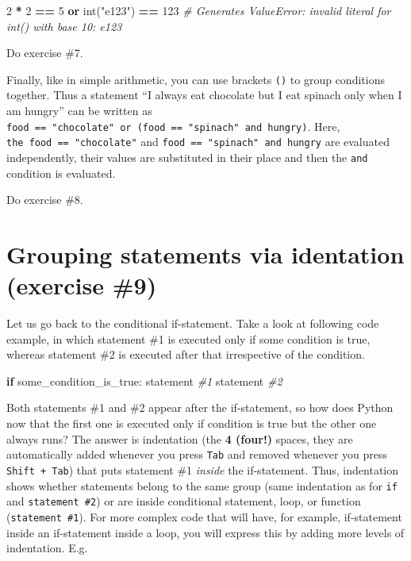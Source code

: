 \documentclass[
]{book}
\newenvironment{Shaded}{\begin{snugshade}}{\end{snugshade}}
\newcommand{\BuiltInTok}[1]{#1}
\newcommand{\CommentTok}[1]{\textcolor[rgb]{0.56,0.35,0.01}{\textit{#1}}}
\newcommand{\ControlFlowTok}[1]{\textcolor[rgb]{0.13,0.29,0.53}{\textbf{#1}}}
\newcommand{\DecValTok}[1]{\textcolor[rgb]{0.00,0.00,0.81}{#1}}
\newcommand{\KeywordTok}[1]{\textcolor[rgb]{0.13,0.29,0.53}{\textbf{#1}}}
\newcommand{\NormalTok}[1]{#1}
\newcommand{\OperatorTok}[1]{\textcolor[rgb]{0.81,0.36,0.00}{\textbf{#1}}}
\newcommand{\StringTok}[1]{\textcolor[rgb]{0.31,0.60,0.02}{#1}}
\begin{document}
\begin{Shaded}
\begin{Highlighting}[]
\DecValTok{2} \OperatorTok{*} \DecValTok{2} \OperatorTok{==} \DecValTok{5} \KeywordTok{or} \BuiltInTok{int}\NormalTok{(}\StringTok{"e123"}\NormalTok{) }\OperatorTok{==} \DecValTok{123}
\CommentTok{\# Generates ValueError: invalid literal for int() with base 10: \textquotesingle{}e123\textquotesingle{}}
\end{Highlighting}
\end{Shaded}

Do exercise \#7.

Finally, like in simple arithmetic, you can use brackets \texttt{()} to group conditions together. Thus a statement ``I always eat chocolate but I eat spinach only when I am hungry'' can be written as \texttt{food\ ==\ "chocolate"\ or\ (food\ ==\ "spinach"\ and\ hungry)}. Here, \texttt{the\ food\ ==\ "chocolate"} and \texttt{food\ ==\ "spinach"\ and\ hungry} are evaluated independently, their values are substituted in their place and then the \texttt{and} condition is evaluated.

Do exercise \#8.

\hypertarget{grouping-statements-via-identation-exercise-9}{%
\section{Grouping statements via identation (exercise \#9)}\label{grouping-statements-via-identation-exercise-9}}

Let us go back to the conditional if-statement. Take a look at following code example, in which statement \#1 is executed only if some condition is true, whereas statement \#2 is executed after that irrespective of the condition.

\begin{Shaded}
\begin{Highlighting}[]
\ControlFlowTok{if}\NormalTok{ some\_condition\_is\_true:}
\NormalTok{    statement }\CommentTok{\#1}
\NormalTok{statement }\CommentTok{\#2 }
\end{Highlighting}
\end{Shaded}

Both statements \#1 and \#2 appear after the if-statement, so how does Python now that the first one is executed only if condition is true but the other one always runs? The answer is indentation (the \textbf{4 (four!)} spaces, they are automatically added whenever you press \texttt{Tab} and removed whenever you press \texttt{Shift\ +\ Tab}) that puts statement \#1 \emph{inside} the if-statement. Thus, indentation shows whether statements belong to the same group (same indentation as for \texttt{if} and \texttt{statement\ \#2}) or are inside conditional statement, loop, or function (\texttt{statement\ \#1}). For more complex code that will have, for example, if-statement inside an if-statement inside a loop, you will express this by adding more levels of indentation. E.g.
\end{document}
